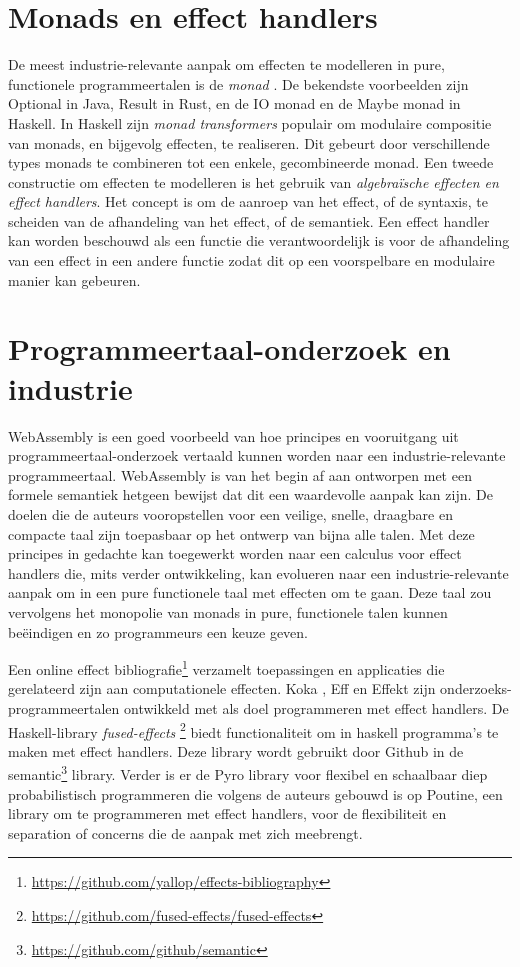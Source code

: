 \section{Monads en effect handlers}
De meest industrie-relevante aanpak om effecten te modelleren in pure, functionele programmeertalen is de \emph{monad} \cite{Moggi1991}. De bekendste voorbeelden zijn Optional in Java, Result in Rust, en de IO monad en de Maybe monad in Haskell. In Haskell zijn \emph{monad transformers}\cite{Liang1995} populair om modulaire compositie van monads, en bijgevolg effecten, te realiseren. Dit gebeurt door verschillende types monads te combineren tot een enkele, gecombineerde monad. \newline 
Een tweede constructie om effecten te modelleren is het gebruik van \emph{algebraïsche effecten \cite{Pretnar2015} en effect handlers}. Het concept is om de aanroep van het effect, of de syntaxis, te scheiden van de afhandeling van het effect, of de semantiek. Een effect handler kan worden beschouwd als een functie die verantwoordelijk is voor de afhandeling van een effect in een andere functie zodat dit op een voorspelbare en modulaire manier kan gebeuren. 

\section{Programmeertaal-onderzoek en industrie}
WebAssembly \cite{Haas2017} is een goed voorbeeld van hoe principes en vooruitgang uit programmeertaal-onderzoek vertaald kunnen worden naar een industrie-relevante programmeertaal. WebAssembly is van het begin af aan ontworpen met een formele semantiek hetgeen bewijst dat dit een waardevolle aanpak kan zijn. De doelen die de auteurs vooropstellen voor een veilige, snelle, draagbare en compacte taal zijn toepasbaar op het ontwerp van bijna alle talen. Met deze principes in gedachte kan toegewerkt worden naar een calculus voor effect handlers die, mits verder ontwikkeling, kan evolueren naar een industrie-relevante aanpak om in een pure functionele taal met effecten om te gaan. Deze taal zou vervolgens het monopolie van monads in pure, functionele talen kunnen beëindigen en zo programmeurs een keuze geven. \newline

Een online effect bibliografie\footnote{\url{https://github.com/yallop/effects-bibliography}} verzamelt toepassingen en applicaties die gerelateerd zijn aan computationele effecten. Koka \cite{Leijen2017}, Eff \cite{Bauer2015} en Effekt \cite{Brachthauser2020} zijn onderzoeks-programmeertalen ontwikkeld met als doel programmeren met effect handlers. De Haskell-library \emph{fused-effects} \footnote{\url{https://github.com/fused-effects/fused-effects}} biedt functionaliteit om in haskell programma's te maken met effect handlers. Deze library wordt gebruikt door Github in de semantic\footnote{\url{https://github.com/github/semantic}} library. Verder is er de Pyro \cite{bingham2019pyro} library voor flexibel en schaalbaar diep probabilistisch programmeren die volgens de auteurs gebouwd is op Poutine, een library om te programmeren met effect handlers, voor de flexibiliteit en separation of concerns die de aanpak met zich meebrengt.

